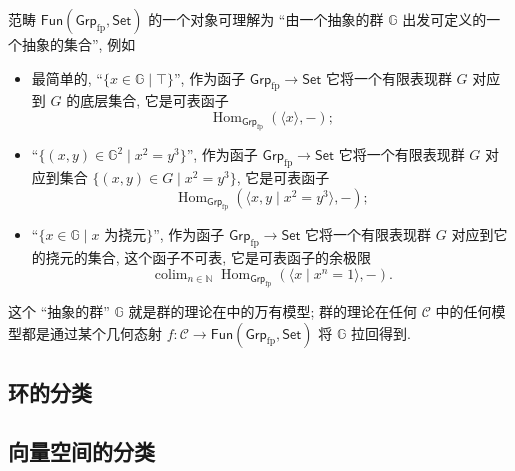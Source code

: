 \begin{remark}
	{}
	范畴 $\mathsf {Fun}(\mathsf {Grp}_{\text{fp}},\mathsf {Set})$ 的一个对象可理解为 ``由一个抽象的群 $\mathbb G$ 出发可定义的一个抽象的集合'', 例如
	\begin{itemize}
		\item 最简单的, ``$\{x\in\mathbb G\mid\top\}$'', 作为函子 $\mathsf {Grp}_{\text{fp}}\to \mathsf {Set}$ 它将一个有限表现群 $G$ 对应到 $G$ 的底层集合, 它是可表函子
		$$
		\operatorname{Hom}_{\mathsf {Grp}_{\text{fp}}}
		(\langle x\rangle,-);
		$$
		\item ``$\{(x,y)\in \mathbb G^2\mid x^2=y^3\}$'', 作为函子 $\mathsf {Grp}_{\text{fp}}\to \mathsf {Set}$ 它将一个有限表现群 $G$ 对应到集合 $\{(x,y)\in G\mid x^2=y^3\}$, 它是可表函子
		$$
		\operatorname{Hom}_{\mathsf {Grp}_{\text{fp}}}
		(\langle x,y\mid x^2=y^3\rangle,-);
		$$
		\item ``$\{x\in \mathbb G\mid \text{$x$ 为挠元}\}$'', 作为函子 $\mathsf {Grp}_{\text{fp}}\to \mathsf {Set}$ 它将一个有限表现群 $G$ 对应到它的挠元的集合, 这个函子不可表, 它是可表函子的余极限
		$$
		\operatorname{colim}_{n\in\mathbb{N}}\operatorname{Hom}_{\mathsf {Grp}_{\text{fp}}}(\langle x\mid x^n=1\rangle,-).
		$$
	\end{itemize}
	这个 ``抽象的群'' $\mathbb G$ 就是群的理论在\topos{}中的万有模型; 群的理论在任何\topos{} $\mathcal C$ 中的任何模型都是通过某个几何态射 $f\colon \mathcal C\to \mathsf {Fun}(\mathsf {Grp}_{\text{fp}},\mathsf {Set})$ 将 $\mathbb G$ 拉回得到.
\end{remark}
\subsection{环的分类\topos{}}


\subsection{向量空间的分类\topos{}}




%
%
%

